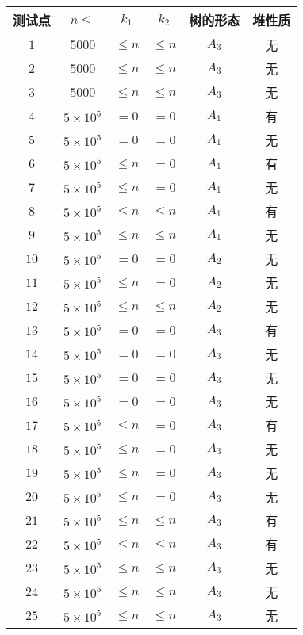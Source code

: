 \begin{table}[H]
\centering
\begin{tabular}{cccccc}
    \toprule
    测试点 & $n\le$ & $k_1$ & $k_2$ & 树的形态 & 堆性质 \\
    \midrule
    $1$ & $5000$ & $\le n$ & $\le n$ & $A_3$ & 无 \\
    $2$ & $5000$ & $\le n$ & $\le n$ & $A_3$ & 无 \\
    $3$ & $5000$ & $\le n$ & $\le n$ & $A_3$ & 无 \\
    $4$ & $5\times 10^5$ & $=0$ & $=0$ & $A_1$ & 有 \\
    $5$ & $5\times 10^5$ & $=0$ & $=0$ & $A_1$ & 无 \\
    $6$ & $5\times 10^5$ & $\le n$ & $=0$ & $A_1$ & 有 \\
    $7$ & $5\times 10^5$ & $\le n$ & $=0$ & $A_1$ & 无 \\
    $8$ & $5\times 10^5$ & $\le n$ & $\le n$ & $A_1$ & 有 \\
    $9$ & $5\times 10^5$ & $\le n$ & $\le n$ & $A_1$ & 无 \\
    $10$ & $5\times 10^5$ & $=0$ & $=0$ & $A_2$ & 无 \\
    $11$ & $5\times 10^5$ & $\le n$ & $=0$ & $A_2$ & 无 \\
    $12$ & $5\times 10^5$ & $\le n$ & $\le n$ & $A_2$ & 无 \\
    $13$ & $5\times 10^5$ & $=0$ & $=0$ & $A_3$ & 有 \\
    $14$ & $5\times 10^5$ & $=0$ & $=0$ & $A_3$ & 无 \\
    $15$ & $5\times 10^5$ & $=0$ & $=0$ & $A_3$ & 无 \\
    $16$ & $5\times 10^5$ & $=0$ & $=0$ & $A_3$ & 无 \\
    $17$ & $5\times 10^5$ & $\le n$ & $=0$ & $A_3$ & 有 \\
    $18$ & $5\times 10^5$ & $\le n$ & $=0$ & $A_3$ & 无 \\
    $19$ & $5\times 10^5$ & $\le n$ & $=0$ & $A_3$ & 无 \\
    $20$ & $5\times 10^5$ & $\le n$ & $=0$ & $A_3$ & 无 \\
    $21$ & $5\times 10^5$ & $\le n$ & $\le n$ & $A_3$ & 有 \\
    $22$ & $5\times 10^5$ & $\le n$ & $\le n$ & $A_3$ & 有 \\
    $23$ & $5\times 10^5$ & $\le n$ & $\le n$ & $A_3$ & 无 \\
    $24$ & $5\times 10^5$ & $\le n$ & $\le n$ & $A_3$ & 无 \\
    $25$ & $5\times 10^5$ & $\le n$ & $\le n$ & $A_3$ & 无 \\
    \bottomrule
\end{tabular}
\end{table}


